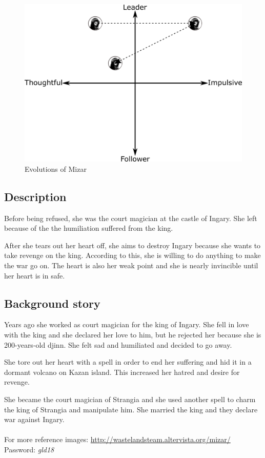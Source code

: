 \begin{figure}[H]
  \centering
  \includegraphics[width=14cm]{Images/Diagrams/Evolutions/mizarEvolution}
  \caption{Evolutions of Mizar}
\end{figure}

\subsection{Description}
Before being refused, she was the court magician at the castle of Ingary. She left because of the the humiliation suffered from the king.

After she tears out her heart off, she aims to destroy Ingary because she wants to take revenge on the king. According to this, she is willing to do anything to make the war go on. The heart is also her weak point and she is nearly invincible until her heart is in safe.

\subsection{Background story}
Years ago she worked as court magician for the king of Ingary. She fell in love with the king and she declared her love to him, but he rejected her because she is 200-years-old djinn. She felt sad and humiliated and decided to go away.

She tore out her heart with a spell in order to end her suffering and hid it in a dormant volcano on Kazan island. This increased her hatred and desire for revenge.

She became the court magician of Strangia and she used another spell to charm the king of Strangia and manipulate him. She married the king and they declare war against Ingary.\\\\
For more reference images: \href{http://wastelandsteam.altervista.org/mizar/}{http://wastelandsteam.altervista.org/mizar/}\\
Password: \textit{gld18}
